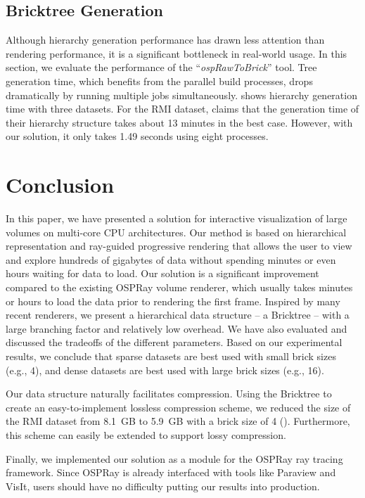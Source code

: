 \subsection{Bricktree Generation}

Although hierarchy generation performance has drawn less attention than rendering
performance, it is a significant bottleneck in real-world usage\cite{fogal2013analysis}. 
In this section, we evaluate the performance of the ``\textit{ospRawToBrick}'' tool. 
Tree generation time, which benefits from the parallel build processes, drops
dramatically by running multiple jobs simultaneously.  shows
 hierarchy generation time with three datasets. For the RMI dataset, \cite{fogal2013analysis} claims that the generation time of their hierarchy structure takes
about 13 minutes in the best case. However, with our solution, it only takes 1.49 seconds using eight processes. 



\section{Conclusion}
In this paper, we have presented a solution for interactive visualization of 
large volumes on multi-core CPU architectures. Our method is based on  
hierarchical representation and ray-guided progressive rendering that 
allows the user to view and explore hundreds of gigabytes of data without
spending minutes or even hours waiting for data to load. 
Our solution is a significant improvement compared to the existing OSPRay volume renderer,
which usually takes minutes or hours to load the data prior to rendering the first frame. 
Inspired by many recent renderers, we present a hierarchical data structure
-- a Bricktree -- with a large branching factor and relatively low overhead. We have
also evaluated and discussed the tradeoffs of the different 
parameters. Based on our experimental results, we conclude that sparse datasets 
are best used with small brick sizes (e.g., 4), and dense datasets are best used with 
large brick sizes (e.g., 16). 

Our data structure naturally facilitates compression. Using the Bricktree to create an easy-to-implement lossless compression scheme, we reduced the size of the RMI dataset from 8.1~GB to 5.9~GB with a brick size of 4 
(). Furthermore, this scheme can easily be extended to support lossy compression.

Finally, we implemented our solution as a module for the OSPRay ray tracing framework. Since OSPRay is already interfaced with tools like Paraview and VisIt, users should have no difficulty putting our results into production.

